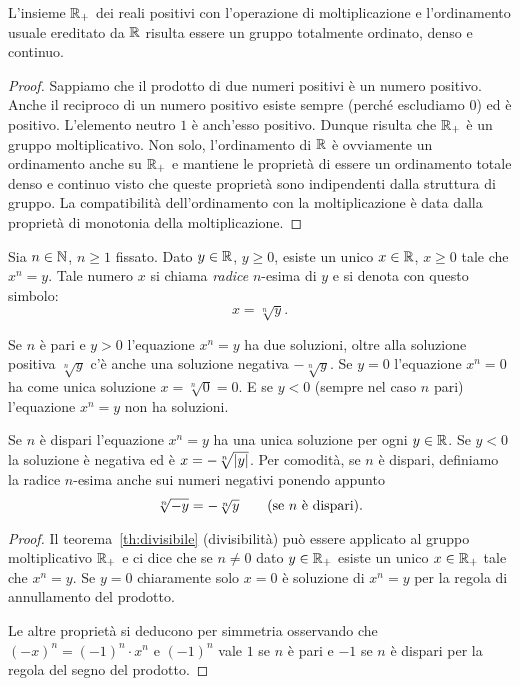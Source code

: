 \begin{theorem}
  \label{th:gruppo_moltiplicativo}%
L'insieme ${\mathbb R}_+$ dei reali positivi con l'operazione di moltiplicazione 
e l'ordinamento usuale ereditato da ${\mathbb R}$ risulta essere 
un gruppo totalmente ordinato, denso e continuo.
\end{theorem}
%
\begin{proof}
Sappiamo che il prodotto di due numeri positivi 
è un numero positivo. Anche il reciproco di un numero positivo
esiste sempre (perché escludiamo $0$) ed è positivo. 
L'elemento neutro $1$ è anch'esso positivo. 
Dunque risulta che ${\mathbb R}_+$ è un gruppo moltiplicativo.
Non solo, l'ordinamento di ${\mathbb R}$ è ovviamente un ordinamento anche su ${\mathbb R}_+$
e mantiene le proprietà di essere un ordinamento totale 
denso e continuo visto che queste proprietà sono indipendenti dalla struttura di gruppo.
La compatibilità dell'ordinamento con la moltiplicazione 
è data dalla proprietà di monotonia della moltiplicazione.
\end{proof}

\begin{theorem}
  \label{radice!$n$-esima}%
Sia $n\in {\mathbb N}$, $n\ge 1$ fissato.
Dato $y\in {\mathbb R}$, $y \ge 0$, esiste un unico $x\in {\mathbb R}$, $x\ge 0$ tale che $x^n = y$.
Tale numero $x$ si chiama \emph{radice} $n$-esima di $y$ e si 
denota con questo simbolo:
\[
  x = \sqrt[n]{y}.
\]

Se $n$ è pari e $y>0$ l'equazione $x^n=y$ ha due soluzioni, oltre alla soluzione positiva 
$\sqrt[n]{y}$ c'è anche una soluzione negativa $-\sqrt[n]{y}$.
Se $y=0$ l'equazione $x^n=0$ ha come unica soluzione $x=\sqrt[n]{0}=0$.
E se $y<0$ (sempre nel caso $n$ pari) l'equazione $x^n = y$ non ha soluzioni.

Se $n$ è dispari l'equazione $x^n=y$ ha una unica soluzione per ogni $y\in {\mathbb R}$.
Se $y<0$ la soluzione è negativa ed è $x=-\sqrt[n]{{\left|y\right|}}$.
Per comodità, se $n$ è dispari, definiamo la radice $n$-esima anche sui numeri negativi 
ponendo appunto 
\[
  \sqrt[n]{-y} =  -\sqrt[n]{y}\qquad\text{(se $n$ è dispari).}
\]
\end{theorem}
\begin{proof}
Il teorema~\ref{th:divisibile} (divisibilità) può essere applicato al gruppo moltiplicativo 
${\mathbb R}_+$ e ci dice che se $n\neq 0$ dato $y\in {\mathbb R}_+$ esiste un unico $x\in {\mathbb R}_+$ tale 
che $x^n = y$. Se $y=0$ chiaramente solo $x=0$ è soluzione di $x^n= y$ per la regola 
di annullamento del prodotto. 

Le altre proprietà si deducono per simmetria osservando che $(-x)^n = (-1)^n\cdot x^n$
e $(-1)^n$ vale $1$ se $n$ è pari e $-1$ se $n$ è dispari per la regola del segno 
del prodotto.
\end{proof}

